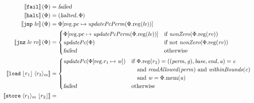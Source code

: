 \documentclass[a4paper]{article}
\newcommand{\update}[2]{[#1 \mapsto #2]}
\newcommand{\sem}[1]{\left\llbracket #1 \right\rrbracket}
\newcommand{\var}[1]{\mathit{#1}}
\newcommand{\rv}{\var{rv}}
\newcommand{\lv}{\var{lv}}
\newcommand{\gl}{\var{g}}
\newcommand{\pcreg}{\mathrm{pc}}
\newcommand{\addr}{\var{a}}
\newcommand{\start}{\var{base}}
\newcommand{\addrend}{\var{end}}
\newcommand{\perm}{\var{perm}}
\newcommand{\stdcap}[1][(\perm,\gl)]{\left(#1,\start,\addrend,\addr \right)}
\newcommand{\plainproj}[1]{\mathrm{#1}}
\newcommand{\memheap}[1][\Phi]{#1.\plainproj{mem}}
\newcommand{\memreg}[1][\Phi]{#1.\plainproj{reg}}
\newcommand{\updateReg}[3][\Phi]{#1\update{\plainproj{reg}.#2}{#3}}
\newcommand{\failed}{\textsl{failed}}
\newcommand{\halted}{\textsl{halted}}
\newcommand{\plainfun}[2]{
  \ifthenelse{\equal{#2}{}}
  {\mathit{#1}}
  {\mathit{#1}(#2)}
}
\newcommand{\updatePcPerm}[1]{\plainfun{updatePcPerm}{#1}}
\newcommand{\nonZero}[1]{\plainfun{nonZero}{#1}}
\newcommand{\readAllowed}[1]{\plainfun{readAllowed}{#1}}
\newcommand{\withinBounds}[1]{\plainfun{withinBounds}{#1}}
\newcommand{\stdUpdatePc}[1]{\plainfun{updatePc}{#1}}
\newcommand{\refreg}[1]{\lfloor #1 \rfloor}
\newcommand{\refheap}[1]{\langle #1 \rangle_m}
\newcommand{\zinstr}[1]{\mathtt{#1}}
\newcommand{\fail}{\zinstr{fail}}
\newcommand{\halt}{\zinstr{halt}}
\newcommand{\oneinstr}[2]{\zinstr{#1} \; #2}
\newcommand{\jmp}[1]{\oneinstr{jmp}{#1}}
\newcommand{\twoinstr}[3]{\zinstr{#1} \; #2 \; #3}
\newcommand{\jnz}[2]{\twoinstr{jnz}{#1}{#2}}
\newcommand{\store}[2]{\twoinstr{store}{#1}{#2}}
\newcommand{\load}[2]{\twoinstr{load}{#1}{#2}}
\begin{document}
\begin{align*}
  \sem{\fail}(\Phi)                        & = \failed \\
  \sem{\halt}(\Phi)                        & = (\halted,\Phi) \\
  \sem{\jmp{\lv}}(\Phi)                    & = \updateReg{\pcreg}{\updatePcPerm{\memreg(\lv)}} \\
  \sem{\jnz{\lv}{\rv}}(\Phi)               & = 
                                             \begin{cases}
                                               \updateReg{\pcreg}{\updatePcPerm{\memreg(\lv)}} &
                                               \arraycolsep=0pt
                                               \begin{array}[t]{l}
                                                 \text{if $\nonZero{\memreg(\rv)}$} 
                                               \end{array}\\
                                               \stdUpdatePc{\Phi} & \text{if not $\nonZero{\memreg(\rv)}$}\\
                                               \failed & \text{otherwise }
                                             \end{cases} \\
  \sem{\load{\refreg{r_1}}{\refheap{r_2}}}  & = 
                                              \begin{cases}
                                                \stdUpdatePc{\updateReg{r_1}{\var{w}}} &
                                                \arraycolsep=0pt
                                                \begin{array}[t]{l}
                                                  \text{if }\memreg(r_2) = \stdcap = \var{c} \\
                                                  \quad\text{and }\readAllowed{\perm} \text{ and } \withinBounds{\var{c}} \\
                                                  \quad\text{and }\var{w} = \memheap(\addr)
                                                \end{array}\\
                                                \failed & \text{otherwise }
                                              \end{cases}\\
  \sem{\store{\refheap{r_1}}{\refreg{r_2}}} & = 

\end{align*}
\end{document}
